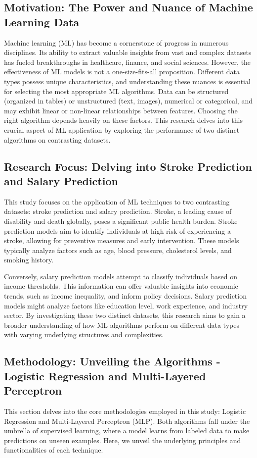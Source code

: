 \documentclass[runningheads]{paper}
\begin{document}
\subsection{Motivation: The Power and Nuance of Machine Learning Data}
Machine learning (ML) has become a cornerstone of progress in numerous 
disciplines. Its ability to extract valuable insights from vast and complex 
datasets has fueled breakthroughs in healthcare, finance, and social sciences. 
However, the effectiveness of ML models is not a one-size-fits-all proposition. 
Different data types possess unique characteristics, and understanding these 
nuances is essential for selecting the most appropriate ML algorithms. Data can 
be structured (organized in tables) or unstructured (text, images), numerical 
or categorical, and may exhibit linear or non-linear relationships between 
features. Choosing the right algorithm depends heavily on these factors. This 
research delves into this crucial aspect of ML application by exploring the 
performance of two distinct algorithms on contrasting datasets.

\subsection{Research Focus: Delving into Stroke Prediction and Salary Prediction}
This study focuses on the application of ML techniques to two contrasting 
datasets: stroke prediction and salary prediction. Stroke, a leading cause of 
disability and death globally, poses a significant public health burden. Stroke 
prediction models aim to identify individuals at high risk of experiencing a 
stroke, allowing for preventive measures and early intervention. These models 
typically analyze factors such as age, blood pressure, cholesterol levels, and 
smoking history.

Conversely, salary prediction models attempt to classify individuals based on 
income thresholds. This information can offer valuable insights into economic 
trends, such as income inequality, and inform policy decisions. Salary 
prediction models might analyze factors like education level, work experience, 
and industry sector. By investigating these two distinct datasets, this research 
aims to gain a broader understanding of how ML algorithms perform on different 
data types with varying underlying structures and complexities.

\subsection{Methodology: Unveiling the Algorithms - Logistic Regression and Multi-Layered Perceptron}
This section delves into the core methodologies employed in this study: 
Logistic Regression and Multi-Layered Perceptron (MLP). Both algorithms fall 
under the umbrella of supervised learning, where a model learns from labeled 
data to make predictions on unseen examples. Here, we unveil the underlying 
principles and functionalities of each technique.
\end{document}
